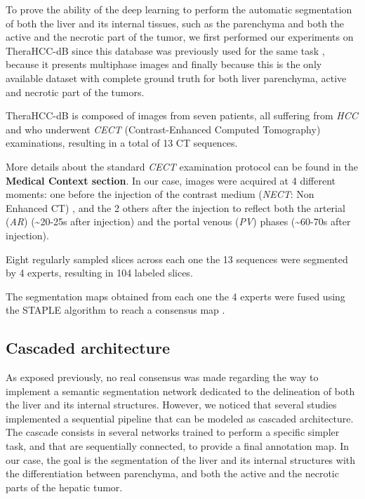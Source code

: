 \documentclass[]{article}
\begin{document}
To prove the ability of the deep learning to perform the automatic
segmentation of both the liver and its internal tissues, such as the
parenchyma and both the active and the necrotic part of the tumor, we
first performed our experiments on TheraHCC-dB since this database was
previously used for the same task \cite{Conze2017}, because it
presents multiphase images and finally because this is the only
available dataset with complete ground truth for both liver parenchyma,
active and necrotic part of the tumors.

TheraHCC-dB is composed of images from seven patients, all suffering
from \emph{HCC} and who underwent \emph{CECT} (Contrast-Enhanced
Computed Tomography) examinations, resulting in a total of 13 CT
sequences.

More details about the standard \emph{CECT} examination protocol can be
found in the \textbf{Medical Context section}. In our case, images were acquired at 4 different
moments: one before the injection of the contrast medium (\emph{NECT}:
Non Enhanced CT) , and the 2 others after the injection to reflect both
the arterial (\emph{AR}) (\textasciitilde{}20-25s after injection) and
the portal venous (\emph{PV}) phases (\textasciitilde{}60-70s after
injection).

Eight regularly sampled slices across each one the 13 sequences were
segmented by 4 experts, resulting in 104 labeled slices.

The segmentation maps obtained from each one the 4 experts were fused
using the STAPLE algorithm to reach a consensus map \cite{Warfield2004}.

\subsection*{Cascaded architecture}

As exposed previously, no real consensus was made regarding the way to
implement a semantic segmentation network dedicated to the delineation
of both the liver and its internal structures. However, we noticed that
several studies implemented a sequential pipeline that can be modeled as
cascaded architecture. The cascade consists in several networks trained
to perform a specific simpler task, and that are sequentially connected, to
provide a final annotation map. In our case, the goal is the
segmentation of the liver and its internal structures with the
differentiation between parenchyma, and both the active and the necrotic
parts of the hepatic tumor.
\end{document}
